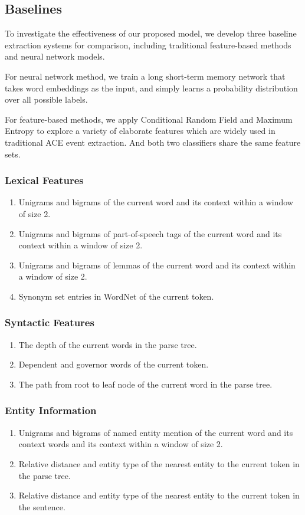 \documentclass{article}
\begin{document}
\subsection{Baselines}
To investigate the effectiveness of our proposed model, we develop three baseline extraction systems for comparison, including traditional feature-based methods and neural network models. 

For neural network method, we train a long short-term memory network that takes word embeddings as the input, and simply learns a probability distribution over all possible labels.

For feature-based methods, we apply Conditional Random Field \cite{lafferty2001conditional} and Maximum Entropy \cite{berger1996maximum} to explore a variety of elaborate features which are widely used in traditional ACE event extraction. And both two classifiers share the same feature sets.

\subsubsection{Lexical Features}
\begin{enumerate}
	\item Unigrams and bigrams of the current word and its context within a window of size 2.
	\item Unigrams and bigrams of part-of-speech tags of the current word and its context within a window of size 2.
	\item Unigrams and bigrams of lemmas of the current word and its context within a window of size 2.
	\item Synonym set entries in WordNet \cite{miller1995wordnet} of the current token.
\end{enumerate}

\subsubsection{Syntactic Features}
\begin{enumerate}
	\item The depth of the current words in the parse tree.
	\item Dependent and governor words of the current token.
	\item The path from root to leaf node of the current word in the parse tree.
\end{enumerate}

\subsubsection{Entity Information}
\begin{enumerate}
	\item Unigrams and bigrams of named entity mention of the current word and its context words and its context within a window of size 2.
	\item Relative distance and entity type of the nearest entity to the current token in the parse tree.
	\item Relative distance and entity type of the nearest entity to the current token in the sentence.
\end{enumerate}
\end{document}

